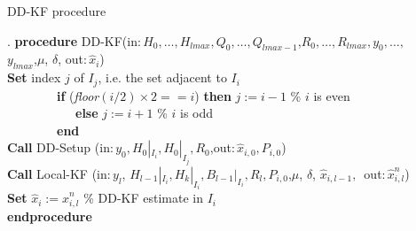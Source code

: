 \documentclass[smallcondensed]{svjour3}
\begin{document}
\begin{table}{}
\caption{ DD-KF procedure}.
\label{DD_KF}
\textbf{procedure}  DD-KF(in:$\,H_{0},\ldots,H_{lmax},Q_0,\ldots,Q_{lmax-1}$,$R_0,\ldots,R_{lmax},y_0,\ldots,$\\ $y_{lmax}$,$\mu$, $\delta$, out:$\,\widehat{x}_{i}$)\\
\textbf{Set}  index $j$ of $I_{j}$, i.e. the set adjacent to  $I_i$ \\
\ \ \ \ \ \ \ \ \textbf{if} (\textit{floor}$(i/2)\times 2==i$) \textbf{then}  $j:=i-1$  \%  $i$ is even\\
\ \ \ \ \ \ \ \ \ \ \ \textbf{else} $j:=i+1$  \%  $i$ is odd\\
\ \ \ \ \ \ \ \  \textbf{end} \\
\textbf{Call} DD-Setup (in:$\,y_0,H_0|_{I_i},H_0|_{I_j},R_0$,out:$\,\widehat{x}_{i,0},P_{i,0}$)\\
\textbf{Call} Local-KF (in:$\,y_{l}$, $H_{l-1}|_{I_{i}},H_{k}|_{I_{i}},B_{l-1}|_{I_{i}},R_{l},P_{i,0}$,$\mu$, $\delta$, $\widehat{x}_{i,l-1},\,$ out:$\,\widehat{x}_{i,l}^{n}$)\\
\textbf{Set} $\widehat{x}_{i}:=\widehat{x}_{i,l}^{n}$ \% DD-KF  estimate in $I_i$\\
\textbf{endprocedure}\\[1cm]


\end{table}
\end{document}
